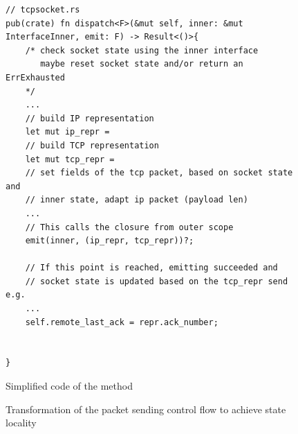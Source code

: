 \begin{figure}[H]
    \centering
\begin{verbatim}
// tcpsocket.rs
pub(crate) fn dispatch<F>(&mut self, inner: &mut InterfaceInner, emit: F) -> Result<()>{
    /* check socket state using the inner interface
       maybe reset socket state and/or return an ErrExhausted
    */
    ...
    // build IP representation
    let mut ip_repr = 
    // build TCP representation
    let mut tcp_repr = 
    // set fields of the tcp packet, based on socket state and
    // inner state, adapt ip packet (payload len)
    ...
    // This calls the closure from outer scope
    emit(inner, (ip_repr, tcp_repr))?;
    
    // If this point is reached, emitting succeeded and
    // socket state is updated based on the tcp_repr send e.g.
    ...
    self.remote_last_ack = repr.ack_number;
    
    
}
\end{verbatim}
    \caption{Simplified code of the  method}
    \label{fig:dispatchCode}
\end{figure}

\begin{figure}[H]
\centering
\tabskip=0pt
\caption{Transformation of the packet sending control flow to achieve state locality}
\label{fig:TransformEgress}
\end{figure}


